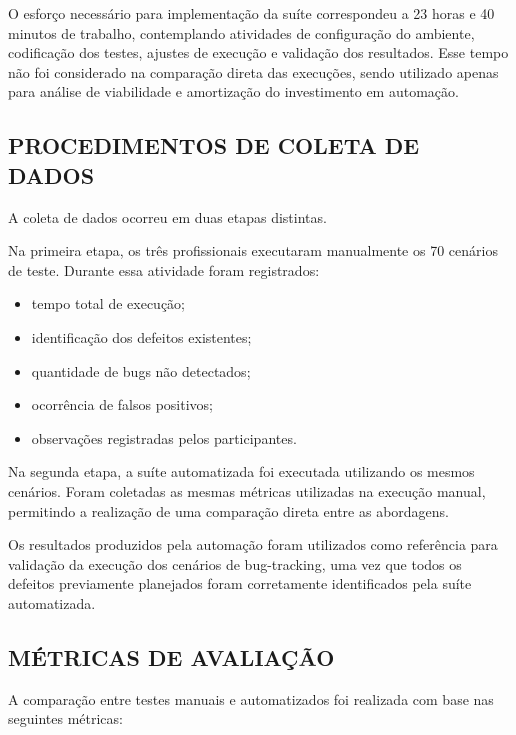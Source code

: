 \documentclass{UNESC}
\begin{document}
O esforço necessário para implementação da suíte correspondeu a 23 horas e 40 minutos de trabalho, contemplando atividades de configuração do ambiente, codificação dos testes, ajustes de execução e validação dos resultados. Esse tempo não foi considerado na comparação direta das execuções, sendo utilizado apenas para análise de viabilidade e amortização do investimento em automação.

\subsection{PROCEDIMENTOS DE COLETA DE DADOS}

A coleta de dados ocorreu em duas etapas distintas.

Na primeira etapa, os três profissionais executaram manualmente os 70 cenários de teste. Durante essa atividade foram registrados:

\begin{itemize}
  \item tempo total de execução;
  \item identificação dos defeitos existentes;
  \item quantidade de bugs não detectados;
  \item ocorrência de falsos positivos;
  \item observações registradas pelos participantes.
\end{itemize}

Na segunda etapa, a suíte automatizada foi executada utilizando os mesmos cenários. Foram coletadas as mesmas métricas utilizadas na execução manual, permitindo a realização de uma comparação direta entre as abordagens.

Os resultados produzidos pela automação foram utilizados como referência para validação da execução dos cenários de bug-tracking, uma vez que todos os defeitos previamente planejados foram corretamente identificados pela suíte automatizada.

\subsection{MÉTRICAS DE AVALIAÇÃO}

A comparação entre testes manuais e automatizados foi realizada com base nas seguintes métricas:
\end{document}
